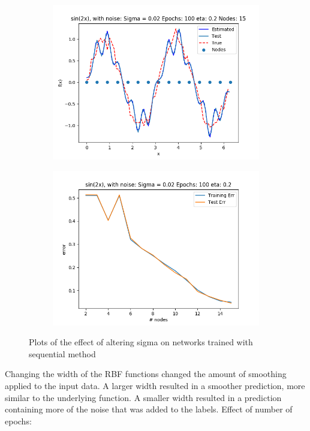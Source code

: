 \documentclass{article}
\begin{document}
\begin{figure}[ht!]
\begin{subfigure}[t]{0.4\textwidth}
        \includegraphics[width=1\textwidth]{plots/noise/seq_sin2x_100ep_sigma002}
        \caption{}
    \end{subfigure}
    \begin{subfigure}[t]{0.4\textwidth}
        \centering
        \includegraphics[width=1\textwidth]{plots/noise/seq_sin2x_100ep_sigma002_error}
        \caption{}
    \end{subfigure}
    \caption{Plots of the effect of altering sigma on networks trained with sequential method}
\end{figure}

Changing the width of the RBF functions changed the amount of smoothing applied to the input data. A larger width resulted in a smoother prediction, more similar to the underlying function. A smaller width resulted in a prediction containing more of the noise that was added to the labels.
Effect of number of epochs:
\end{document}
